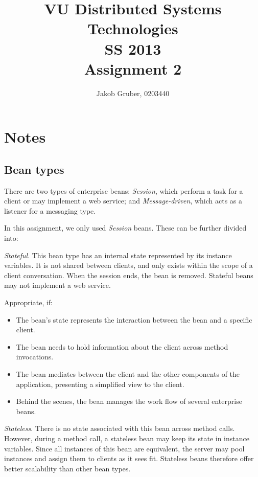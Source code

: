 \documentclass[a4paper,10pt]{article}
\title{VU Distributed Systems Technologies \\
       SS 2013 \\
       Assignment 2}
\author{Jakob Gruber, 0203440}
\begin{document}
\maketitle


\section{Notes}

\subsection{Bean types} \label{sec:beans}

There are two types of enterprise beans: \emph{Session}, which perform a task for
a client or may implement a web service; and \emph{Message-driven}, which acts
as a listener for a messaging type.

In this assignment, we only used \emph{Session} beans. These can be further divided
into:

\emph{Stateful}. This bean type has an internal state represented by its instance variables.
It is not shared between clients, and only exists within the scope of a client
conversation. When the session ends, the bean is removed. Stateful beans may not implement
a web service.

Appropriate, if: 

\begin{itemize}
    \item The bean’s state represents the interaction between the bean and a specific client.
    \item The bean needs to hold information about the client across method invocations.
    \item The bean mediates between the client and the other components of the application, presenting a simplified view to the client.
    \item Behind the scenes, the bean manages the work flow of several enterprise beans.
\end{itemize}

\emph{Stateless}. There is no state associated with this bean across method calls. However,
during a method call, a stateless bean may keep its state in instance variables.
Since all instances of this bean are equivalent, the server may pool instances and
assign them to clients as it sees fit. Stateless beans therefore offer better scalability
than other bean types. 
\end{document}
